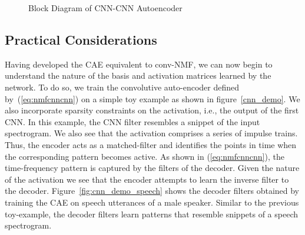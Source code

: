 \documentclass{article}
\begin{document}
\begin{figure}
  \centering
  \caption{Block Diagram of CNN-CNN Autoencoder} 
  \label{CNN-CNN Auto Encoder}
\end{figure}


\subsection{Practical Considerations}
\label{subsec:practical}
Having developed the CAE equivalent to conv-NMF, we can now begin to understand the nature of the basis and activation matrices learned by the network. To do so, we train the convolutive auto-encoder defined by~(\ref{eq:nmfcnncnn}) on a simple toy example as shown in figure~\ref{cnn_demo}. We also incorporate sparsity constraints on the activation, i.e., the output of the first CNN. In this example, the CNN filter resembles a snippet of the input spectrogram. We also see that the activation comprises a series of impulse trains. Thus, the encoder acts as a matched-filter and identifies the points in time when the corresponding pattern becomes active. As shown in (\ref{eq:nmfcnncnn}), the time-frequency pattern is captured by the filters of the decoder. Given the nature of the activation we see that the encoder attempts to learn the inverse filter to the decoder. Figure~\ref{fig:cnn_demo_speech} shows the decoder filters obtained by training the CAE on speech utterances of a male speaker. Similar to the previous toy-example, the decoder filters learn patterns that resemble snippets of a speech spectrogram. 
\end{document}
